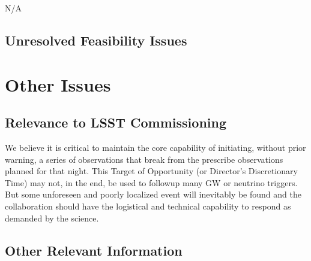 \documentclass [11pt]{article}
\begin{document}
%
%

N/A

\subsection{Unresolved Feasibility Issues}



\section{Other Issues}


\subsection{Relevance to LSST Commissioning}

We believe it is critical to maintain the core capability of initiating, without prior warning, a series of observations that break from the prescribe observations planned for that night. This Target of Opportunity (or Director's Discretionary Time) may not, in the end, be used to followup many GW or neutrino triggers. But some unforeseen and poorly localized event will inevitably be found and the collaboration should have the logistical and technical capability to respond as demanded by the science.

\subsection{Other Relevant Information}
\end{document}
